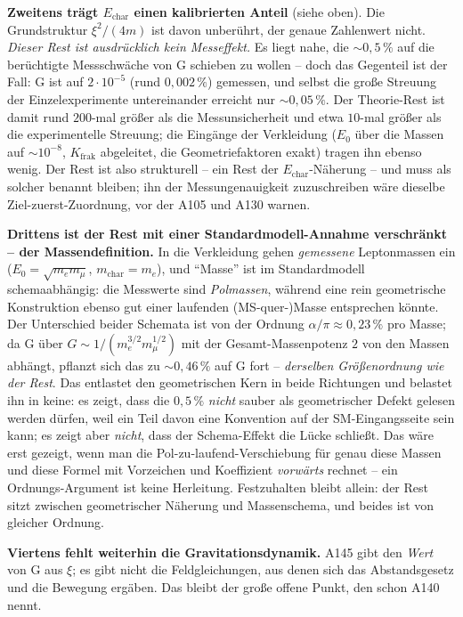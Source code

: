 \textbf{Zweitens trägt $E_\text{char}$ einen kalibrierten Anteil} (siehe oben).
Die Grundstruktur $\xi^2/(4m)$ ist davon unberührt, der genaue Zahlenwert
nicht. \emph{Dieser Rest ist ausdrücklich kein Messeffekt.} Es liegt nahe, die
$\sim0{,}5\,\%$ auf die berüchtigte Messschwäche von G schieben zu wollen -- doch
das Gegenteil ist der Fall: G ist auf $2\cdot10^{-5}$ (rund $0{,}002\,\%$)
gemessen, und selbst die große Streuung der Einzelexperimente untereinander
erreicht nur $\sim0{,}05\,\%$. Der Theorie-Rest ist damit rund $200$-mal größer
als die Messunsicherheit und etwa $10$-mal größer als die experimentelle
Streuung; die Eingänge der Verkleidung ($E_0$ über die Massen auf $\sim10^{-8}$,
$K_\text{frak}$ abgeleitet, die Geometriefaktoren exakt) tragen ihn ebenso wenig.
Der Rest ist also strukturell -- ein Rest der $E_\text{char}$-Näherung -- und
muss als solcher benannt bleiben; ihn der Messungenauigkeit zuzuschreiben wäre
dieselbe Ziel-zuerst-Zuordnung, vor der A105 und A130 warnen.

\textbf{Drittens ist der Rest mit einer Standardmodell-Annahme verschränkt --
der Massendefinition.} In die Verkleidung gehen \emph{gemessene} Leptonmassen
ein ($E_0=\sqrt{m_e m_\mu}$, $m_\text{char}=m_e$), und \enquote{Masse} ist im
Standardmodell schemaabhängig: die Messwerte sind \emph{Polmassen}, während eine
rein geometrische Konstruktion ebenso gut einer laufenden (MS-quer-)Masse
entsprechen könnte. Der Unterschied beider Schemata ist von der Ordnung
$\alpha/\pi \approx 0{,}23\,\%$ pro Masse; da G über
$G\sim 1/(m_e^{3/2} m_\mu^{1/2})$ mit der Gesamt-Massenpotenz $2$ von den Massen
abhängt, pflanzt sich das zu $\sim 0{,}46\,\%$ auf G fort -- \emph{derselben
Größenordnung wie der Rest}. Das entlastet den geometrischen Kern in beide
Richtungen und belastet ihn in keine: es zeigt, dass die $0{,}5\,\%$
\emph{nicht} sauber als geometrischer Defekt gelesen werden dürfen, weil ein Teil
davon eine Konvention auf der SM-Eingangsseite sein kann; es zeigt aber
\emph{nicht}, dass der Schema-Effekt die Lücke schließt. Das wäre erst gezeigt,
wenn man die Pol-zu-laufend-Verschiebung für genau diese Massen und diese Formel
mit Vorzeichen und Koeffizient \emph{vorwärts} rechnet -- ein Ordnungs-Argument
ist keine Herleitung. Festzuhalten bleibt allein: der Rest sitzt zwischen
geometrischer Näherung und Massenschema, und beides ist von gleicher Ordnung.

\textbf{Viertens fehlt weiterhin die Gravitationsdynamik.} A145 gibt den
\emph{Wert} von G aus $\xi$; es gibt nicht die Feldgleichungen, aus denen sich
das Abstandsgesetz und die Bewegung ergäben. Das bleibt der große offene Punkt,
den schon A140 nennt.

